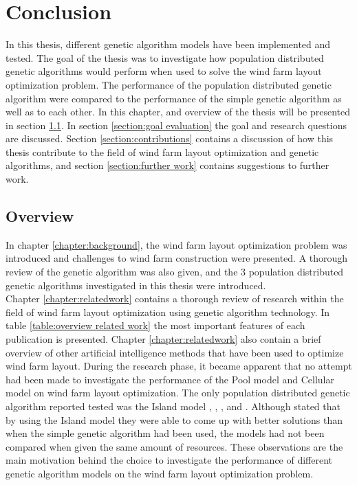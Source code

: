 \chapter{Conclusion}\label{chapter:conclusion}


\noindent In this thesis, different genetic algorithm models have been implemented and tested. The goal of the thesis was to investigate how population distributed genetic algorithms would perform when used to solve the wind farm layout optimization problem. The performance of the population distributed genetic algorithm were compared to the performance of the simple genetic algorithm as well as to each other. In this chapter, and overview of the thesis will be presented in section \ref{section:overview}. In section \ref{section:goal evaluation} the goal and research questions are discussed. Section \ref{section:contributions} contains a discussion of how this thesis contribute to the field of wind farm layout optimization and genetic algorithms, and section \ref{section:further work} contains suggestions to further work.\\


\section{Overview}\label{section:overview}


\noindent In chapter \ref{chapter:background}, the wind farm layout optimization problem was introduced and challenges to wind farm construction were presented. A thorough review of the genetic algorithm was also given, and the 3 population distributed genetic algorithms investigated in this thesis were introduced.\\


\noindent Chapter \ref{chapter:relatedwork} contains a thorough review of research within the field of wind farm layout optimization using genetic algorithm technology. In table \ref{table:overview related work} the most important features of each publication is presented. Chapter \ref{chapter:relatedwork} also contain a brief overview of other artificial intelligence methods that have been used to optimize wind farm layout. During the research phase, it became apparent that no attempt had been made to investigate the performance of the Pool model and Cellular model on wind farm layout optimization. The only population distributed genetic algorithm reported tested was the Island model \cite{Grady}, \cite{Huang}, \cite{Wan}, \cite{Sisbot} and \cite{Gao}. Although \citep{Grady} stated that by using the Island model they were able to come up with better solutions than when the simple genetic algorithm had been used, the models had not been compared when given the same amount of resources. These observations are the main motivation behind the choice to investigate the performance of different genetic algorithm models on the wind farm layout optimization problem.\\ 


